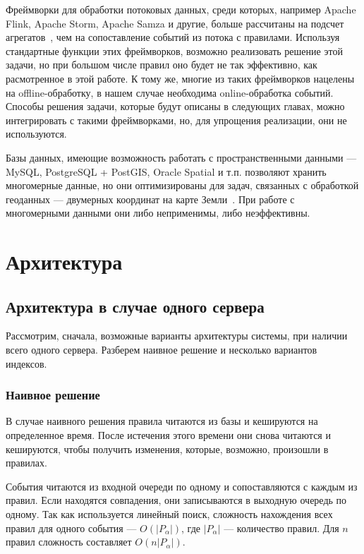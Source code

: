 \documentclass[14pt]{article}
\begin{document}
Фреймворки для обработки потоковых данных, среди которых, например Apache Flink, Apache Storm, Apache Samza и другие, больше рассчитаны на подсчет агрегатов~\cite{flink-use-cases, storm-documentation, samza-streams-api}, чем на сопоставление событий из потока с правилами. Используя стандартные функции этих фреймворков, возможно реализовать решение этой задачи, но при большом числе правил оно будет не так эффективно, как расмотренное в этой работе. К тому же, многие из таких фреймворков нацелены на offline-обработку, в нашем случае необходима online-обработка событий. Способы решения задачи, которые будут описаны в следующих главах, можно интегрировать с такими фреймворками, но, для упрощения реализации, они не используются.

Базы данных, имеющие возможность работать с пространственными данными --- MySQL, PostgreSQL + PostGIS, Oracle Spatial и т.п. позволяют хранить многомерные данные, но они оптимизированы для задач, связанных с обработкой геоданных --- двумерных координат на карте Земли~\cite{mysql-spatial, postgis, oracle-spatial}. При работе с многомерными данными они либо неприменимы, либо неэффективны.

\section{Архитектура}
\subsection{Архитектура в случае одного сервера}
Рассмотрим, сначала, возможные варианты архитектуры системы, при наличии всего одного сервера. Разберем наивное решение и несколько вариантов индексов.

\subsubsection{Наивное решение}
В случае наивного решения правила читаются из базы и кешируются на определенное время. После истечения этого времени они снова читаются и кешируются, чтобы получить изменения, которые, возможно, произошли в правилах.

События читаются из входной очереди по одному и сопоставляются с каждым из правил. Если находятся совпадения, они записываются в выходную очередь по одному. Так как используется линейный поиск, сложность нахождения всех правил для одного события --- $O(|P_\alpha|)$, где $|P_\alpha|$ --- количество правил. Для $n$ правил сложность составляет $O(n|P_\alpha|)$.
\end{document}
